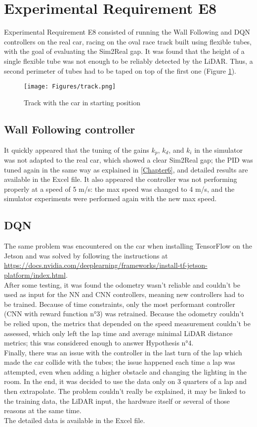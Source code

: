 \section{Experimental Requirement E8}
Experimental Requirement E8 consisted of running the Wall Following and DQN controllers on the real car, racing on the oval race track built using flexible tubes, with the goal of evaluating the Sim2Real gap. It was found that the height of a single flexible tube was not enough to be reliably detected by the LiDAR. Thus, a second perimeter of tubes had to be taped on top of the first one (Figure \ref{track}).

\begin{figure}
\centering
\texttt{[image: Figures/track.png]}
\caption{Track with the car in starting position}
\label{track}
\end{figure}

\subsection{Wall Following controller}
It quickly appeared that the tuning of the gains $k_p$, $k_d$, and $k_i$ in the simulator was not adapted to the real car, which showed a clear Sim2Real gap; the PID was tuned again in the same way as explained in \ref{Chapter6}, and detailed results are available in the Excel file. It also appeared the controller was not performing properly at a speed of 5 m/s: the max speed was changed to 4 m/s, and the simulator experiments were performed again with the new max speed. 
\subsection{DQN}
The same problem was encountered on the car when installing TensorFlow on the Jetson and was solved by following the instructions at \url{https://docs.nvidia.com/deeplearning/frameworks/install-tf-jetson-platform/index.html}. \\
After some testing, it was found the odometry wasn't reliable and couldn't be used as input for the NN and CNN controllers, meaning new controllers had to be trained. Because of time constraints, only the most performant controller (CNN with reward function n°3) was retrained. Because the odometry couldn't be relied upon, the metrics that depended on the speed measurement couldn't be assessed, which only left the lap time and average minimal LiDAR distance metrics; this was considered enough to answer Hypothesis n°4. \\
Finally, there was an issue with the controller in the last turn of the lap which made the car collide with the tubes; the issue happened each time a lap was attempted, even when adding a higher obstacle and changing the lighting in the room. In the end, it was decided to use the data only on 3 quarters of a lap and then extrapolate. The problem couldn't really be explained, it may be linked to the training data, the LiDAR input, the hardware itself or several of those reasons at the same time. \\
The detailed data is available in the Excel file.